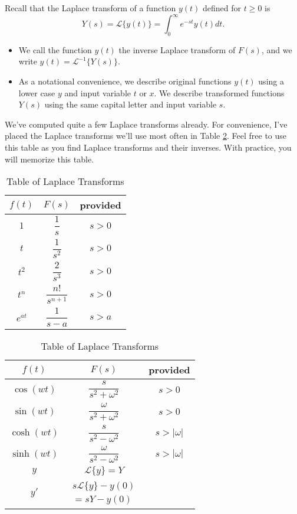 Recall that the Laplace transform of a function $y(t)$ defined for $t\geq 0$ is $$Y(s)=\mathscr{L}\{y(t)\}=\int_0^\infty e^{-st}y(t)dt.$$ 
\begin{itemize}
 \item We call the function $y(t)$ the inverse Laplace transform of $F(s)$, and we write $y(t)=\mathscr{L}^{-1}\{Y(s)\}$. 
 \item As a notational convenience, we describe original functions $y(t)$ using a lower case $y$ and input variable $t$ or $x$. 
 We describe transformed functions $Y(s)$ using the same capital letter and input variable $s$.
\end{itemize}
We've computed quite a few Laplace transforms already.  For convenience, I've placed the Laplace transforms we'll use most often in Table \ref{laplacetable}. Feel free to use this table as you find Laplace transforms and their inverses.  With practice, you will memorize this table.
\begin{table}
\begin{center}
\begin{tabular}[t]{|c|cc|}
\hline
$f(t)$ & $F(s)$ & provided\\
\hline\hline
$1$					&$\dfrac{1}{s}$ 							&$s>0$\\\hline
$t$				&$\dfrac{1}{s^{2}}$ 			&$s>0$\\\hline
$t^2$				&$\dfrac{2}{s^{3}}$ 			&$s>0$\\\hline
$t^n$				&$\dfrac{n!}{s^{n+1}}$ 			&$s>0$\\\hline
$e^{at}$		&$\dfrac{1}{s-a}$ 			&$s>a$\\\hline
\end{tabular}
\quad
\begin{tabular}[t]{|c|cc|}
\hline
$f(t)$ & $F(s)$ & provided\\
\hline\hline
$\cos(wt)$  &$\dfrac{s}{s^2+\omega^2}$ 			&$s>0$\\\hline
$\sin(wt)$  &$\dfrac{\omega}{s^2+\omega^2}$ 			&$s>0$\\\hline
$\cosh(wt)$ &$\dfrac{s}{s^2-\omega^2}$ 			&$s>|\omega|$\\\hline
$\sinh(wt)$ &$\dfrac{\omega}{s^2-\omega^2}$ 			&$s>|\omega|$\\\hline
$y$     	&$\mathscr{L}\{y\}=Y$ 					&\\\hline
$y'$		&$\begin{array}{rl}s\mathscr{L}\{y\}-y(0)\\ =sY-y(0)\end{array}$ &\\\hline
\end{tabular}

\caption{Table of Laplace Transforms}
\label{laplacetable}
\end{center}
\end{table}

